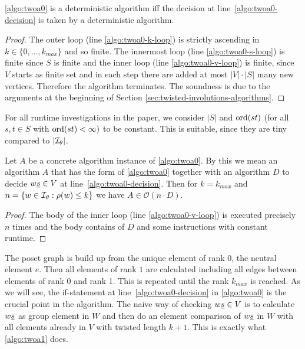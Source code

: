 \begin{lemm}
	\ref{algo:twoa0} is a deterministic algorithm iff the decision at line~\ref{algo:twoa0-decision} is taken by a deterministic algorithm.

	\begin{proof}
		The outer loop (line \ref{algo:twoa0-k-loop}) is strictly ascending in $k \in \{0,\ldots,k_{max}\}$ and so finite. The innermost loop (line \ref{algo:twoa0-s-loop}) is finite since $S$ is finite and the inner loop (line \ref{algo:twoa0-v-loop}) is finite, since $V$ starts as finite set and in each step there are added at most $|V| \cdot |S|$ many new vertices. Therefore the algorithm terminates. The soundness is due to the arguments at the beginning of Section \ref{sec:twisted-involutions-algorithms}.
	\end{proof}
\end{lemm}

For all runtime investigations in the paper, we consider $|S|$ and $\operatorname{ord}(st)$ (for all $s,t \in S$ with $\operatorname{ord}(st) < \infty)$ to be constant. This is suitable, since they are tiny compared to $|\mathcal{I}_{\theta}|$. 

\begin{prop}
	Let $A$ be a concrete algorithm instance of \ref{algo:twoa0}. By this we mean an algorithm $A$ that has the form of \ref{algo:twoa0} together with an algorithm $D$ to decide $w \underline{s} \in V$ at line~\ref{algo:twoa0-decision}. Then for $k = k_{max}$ and $n = \{ w \in \mathcal{I}_{\theta} : \rho(w) \leq k \}$ we have $A \in \mathcal{O}(n \cdot D)$.

	\begin{proof}
		The body of the inner loop (line \ref{algo:twoa0-v-loop}) is executed precisely $n$ times and the body contains of $D$ and some instructions with constant runtime.
	\end{proof}
\end{prop}

The poset graph is build up from the unique element of rank 0, the neutral element $e$. Then all elements of rank $1$ are calculated including all edges between elements of rank 0 and rank 1. This is repeated until the rank $k_{max}$ is reached. As we will see, the if-statement at line~\ref{algo:twoa0-decision} in \ref{algo:twoa0} is the crucial point in the algorithm. The naive way of checking $w \underline{s} \in V$ is to calculate $w \underline{s}$ as group element in $W$ and then do an element comparison of $w \underline{s}$ in $W$ with all elements already in $V$ with twisted length $k+1$. This is exactly what \ref{algo:twoa1} does.

